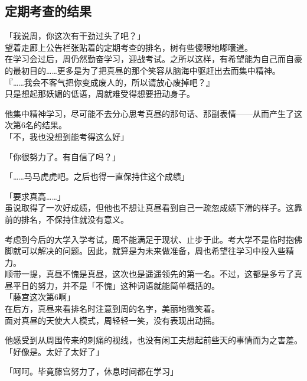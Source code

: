\subsection{定期考查的结果}

「我说周，你这次有干劲过头了吧？」\\

望着走廊上公告栏张贴着的定期考查的排名，树有些傻眼地嘟囔道。\\

在学习会过后，周仍然勤奋学习，迎战考试。之所以这样，有希望能为自己而自豪的最初目的……更多是为了把真昼的那个笑容从脑海中驱赶出去而集中精神。\\

『……我会不客气把你变成废人的，所以请放心废掉吧？』\\

只是想起那妖媚的低语，周就难受得想要扭动身子。

他集中精神学习，尽可能不去分心思考真昼的那句话、那副表情——从而产生了这次第6名的结果。\\

「不，我也没想到能考得这么好」

「你很努力了。有自信了吗？」

「……马马虎虎吧。之后也得一直保持住这个成绩」

「要求真高……」\\

虽说取得了一次好成绩，但他也不想让真昼看到自己一疏忽成绩下滑的样子。这靠前的排名，不保持住就没有意义。

考虑到今后的大学入学考试，周不能满足于现状、止步于此。考大学不是临时抱佛脚就可以解决的问题。因此，就算是为未来做准备，周也希望往学习中投入些精力。\\

顺带一提，真昼不愧是真昼，这次也是遥遥领先的第一名。不过，这都是多亏了真昼平日的努力，并不是「不愧」这种词语就能简单概括的。\\

「藤宫这次第6啊」\\

在后方，真昼来看排名时注意到周的名字，美丽地微笑着。\\

面对真昼的天使大人模式，周轻轻一笑，没有表现出动摇。

他感受到从周围传来的刺痛的视线，也没有闲工夫想起前些天的事情而为之害羞。\\

「好像是。太好了太好了」

「呵呵。毕竟藤宫努力了，休息时间都在学习」

